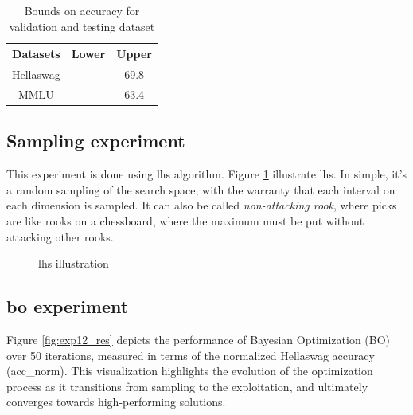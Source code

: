 \begin{table}[h]
    \centering
    \begin{tabular}{|c||c|c|}
    \hline
       Datasets  & Lower & Upper \\
    \hline
       Hellaswag  & & 69.8\\
       MMLU & & 63.4\\
    \hline
    \end{tabular}
    \caption{Bounds on accuracy for validation and testing dataset}
    \label{tab:bounds}
\end{table}

\subsection{Sampling experiment}
\label{sec:sampling}

This experiment is done using \acrfull{lhs} algorithm. Figure \ref{fig:lhs} illustrate \acrshort{lhs}. In simple, it's a random sampling of the search space, with the warranty that each interval on each dimension is sampled. It can also be called \textit{non-attacking rook}, where picks are like rooks on a chessboard, where the maximum must be put without attacking other rooks.

\begin{figure}[h]
    \centering
    
    \caption{\acrshort{lhs} illustration}
    \label{fig:lhs}
\end{figure}


\subsection{\acrshort{bo} experiment}
\label{sec:bo_exp}


Figure \ref{fig:exp12_res} depicts the performance of Bayesian Optimization (BO) over 50 iterations, measured in terms of the normalized Hellaswag accuracy (acc\_norm). This visualization highlights the evolution of the optimization process as it transitions from sampling to the exploitation, and ultimately converges towards high-performing solutions.


